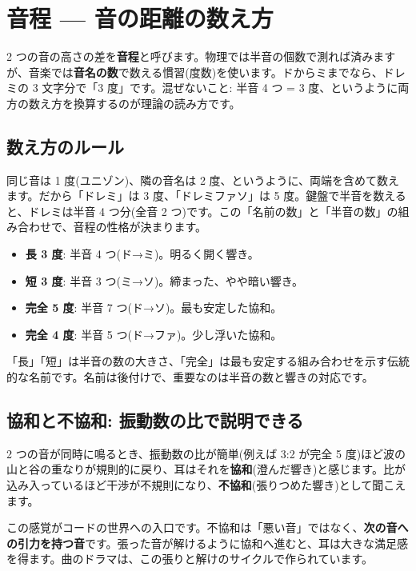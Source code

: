 \documentclass{article}
\begin{document}
\section{音程 — 音の距離の数え方}

2 つの音の高さの差を\textbf{音程}と呼びます。物理では半音の個数で測れば済みますが、音楽では\textbf{音名の数}で数える慣習(度数)を使います。ドからミまでなら、ドレミの 3 文字分で「3 度」です。混ぜないこと: 半音 4 つ = 3 度、というように両方の数え方を換算するのが理論の読み方です。

\subsection{数え方のルール}

同じ音は 1 度(ユニゾン)、隣の音名は 2 度、というように、両端を含めて数えます。だから「ドレミ」は 3 度、「ドレミファソ」は 5 度。鍵盤で半音を数えると、ドレミは半音 4 つ分(全音 2 つ)です。この「名前の数」と「半音の数」の組み合わせで、音程の性格が決まります。

\begin{itemize}
\item \textbf{長 3 度}: 半音 4 つ(ド→ミ)。明るく開く響き。
\item \textbf{短 3 度}: 半音 3 つ(ミ→ソ)。締まった、やや暗い響き。
\item \textbf{完全 5 度}: 半音 7 つ(ド→ソ)。最も安定した協和。
\item \textbf{完全 4 度}: 半音 5 つ(ド→ファ)。少し浮いた協和。
\end{itemize}

「長」「短」は半音の数の大きさ、「完全」は最も安定する組み合わせを示す伝統的な名前です。名前は後付けで、重要なのは半音の数と響きの対応です。

\subsection{協和と不協和: 振動数の比で説明できる}

2 つの音が同時に鳴るとき、振動数の比が簡単(例えば 3:2 が完全 5 度)ほど波の山と谷の重なりが規則的に戻り、耳はそれを\textbf{協和}(澄んだ響き)と感じます。比が込み入っているほど干渉が不規則になり、\textbf{不協和}(張りつめた響き)として聞こえます。

この感覚がコードの世界への入口です。不協和は「悪い音」ではなく、\textbf{次の音への引力を持つ音}です。張った音が解けるように協和へ進むと、耳は大きな満足感を得ます。曲のドラマは、この張りと解けのサイクルで作られています。
\end{document}
